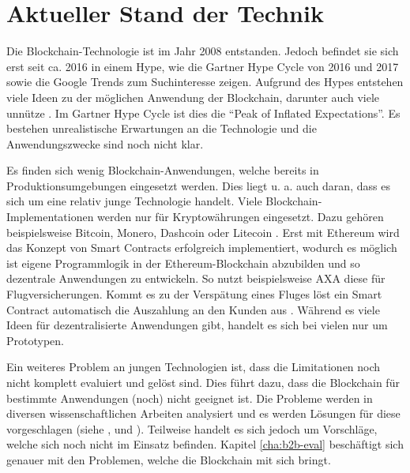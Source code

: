 \chapter{Aktueller Stand der Technik}
\label{cha:stand-technik}

Die Blockchain-Technologie ist im Jahr 2008 entstanden. Jedoch befindet sie sich erst seit ca. 2016 in einem Hype, wie die Gartner Hype Cycle von 2016 und 2017 \cite{PanettaTopTrendsGartner2017}\cite{AmyGartner2016Hype2016} sowie die Google Trends zum Suchinteresse \cite{GoogleBlockchainGoogleTrends18} zeigen. Aufgrund des Hypes entstehen viele Ideen zu der möglichen Anwendung der Blockchain, darunter auch viele unnütze \cite{WustyouneedBlockchain2017}. Im Gartner Hype Cycle ist dies die ``Peak of Inflated Expectations''. Es bestehen unrealistische Erwartungen an die Technologie und die Anwendungszwecke sind noch nicht klar. 

Es finden sich wenig Blockchain-Anwendungen, welche bereits in Produktionsumgebungen eingesetzt werden. Dies liegt u. a. auch daran, dass es sich um eine relativ junge Technologie handelt. Viele Blockchain-Implementationen werden nur für Kryptowährungen eingesetzt. Dazu gehören beispielsweise Bitcoin, Monero, Dashcoin oder Litecoin \cite{BlockchainHubBlockchainsDistributedLedger}. Erst mit Ethereum wird das Konzept von Smart Contracts erfolgreich implementiert, wodurch es möglich ist eigene Programmlogik in der Ethereum-Blockchain abzubilden und so dezentrale Anwendungen zu entwickeln. So nutzt beispielsweise AXA diese für Flugversicherungen. Kommt es zu der Verspätung eines Fluges löst ein Smart Contract automatisch die Auszahlung an den Kunden aus \cite{BoerAXAnutztEthereumBlockchain2017}. Während es viele Ideen für dezentralisierte Anwendungen gibt, handelt es sich bei vielen nur um Prototypen.

Ein weiteres Problem an jungen Technologien ist, dass die Limitationen noch nicht komplett evaluiert und gelöst sind. Dies führt dazu, dass die Blockchain für bestimmte Anwendungen (noch) nicht geeignet ist. Die Probleme werden in diversen wissenschaftlichen Arbeiten analysiert und es werden Lösungen für diese vorgeschlagen (siehe \cite{ZhengBlockchainChallengesOpportunities2017}, \cite[S.~84]{SwanBlockchainblueprintnew2015} und \cite{SchererPerformanceScalabilityBlockchain2017}). Teilweise handelt es sich jedoch um Vorschläge, welche sich noch nicht im Einsatz befinden. Kapitel \ref{cha:b2b-eval} beschäftigt sich genauer mit den Problemen, welche die Blockchain mit sich bringt.

